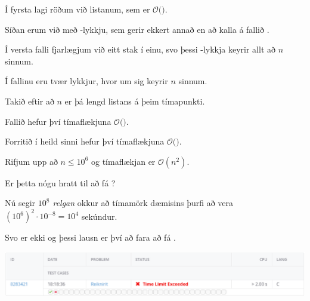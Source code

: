 {
	{
		\item<1-> Í fyrsta lagi röðum við listanum, sem er $\mathcal{O}($\onslide<2->{$n \log n$}$)$.
		\item<3-> Síðan erum við með -lykkju, sem gerir ekkert annað en að kalla á fallið .
		\item<4-> Í versta falli fjarlægjum við eitt stak í einu, svo þessi -lykkja keyrir allt að $n$ sinnum.
		\item<5-> Í fallinu  eru tvær lykkjur, hvor um sig keyrir $n$ sinnum.
		\item<6-> Takið eftir að $n$ er þá lengd listans á þeim tímapunkti.
		\item<7-> Fallið  hefur því tímaflækjuna $\mathcal{O}($\onslide<8->{$\,n\,$}$)$.
		\item<9-> Forritið í heild sinni hefur því tímaflækjuna $\mathcal{O}($\onslide<10->{$n^2$}$)$.
	}
}

{
	{
		\item<1-> Rifjum upp að $n \leq 10^6$ og tímaflækjan er $\mathcal{O}(n^2)$.
		\item<2-> Er þetta nógu hratt til að fá ?
		\item<3-> Nú segir \emph{$10^8$ relgan} okkur að tímamörk dæmisins þurfi að vera $(10^6)^2 \cdot 10^{-8} = 10^4$ sekúndur.
		\item<4-> Svo er ekki og þessi lausn er því að fara að fá .
		\item<5->[] \includegraphics[scale = 0.25]{fig/tle}
	}
}

{
}


